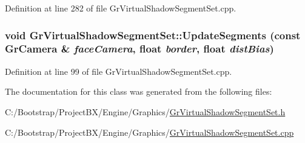 Definition at line 282 of file GrVirtualShadowSegmentSet.cpp.\hypertarget{class_gr_virtual_shadow_segment_set_92e15d9d6393687920a408901ba53cd2}{
\subsubsection[{UpdateSegments}]{\setlength{\rightskip}{0pt plus 5cm}void GrVirtualShadowSegmentSet::UpdateSegments (const {\bf GrCamera} \& {\em faceCamera}, \/  float {\em border}, \/  float {\em distBias})}}
\label{class_gr_virtual_shadow_segment_set_92e15d9d6393687920a408901ba53cd2}




Definition at line 99 of file GrVirtualShadowSegmentSet.cpp.

The documentation for this class was generated from the following files:\begin{CompactItemize}
\item 
C:/Bootstrap/ProjectBX/Engine/Graphics/\hyperlink{_gr_virtual_shadow_segment_set_8h}{GrVirtualShadowSegmentSet.h}\item 
C:/Bootstrap/ProjectBX/Engine/Graphics/\hyperlink{_gr_virtual_shadow_segment_set_8cpp}{GrVirtualShadowSegmentSet.cpp}\end{CompactItemize}
